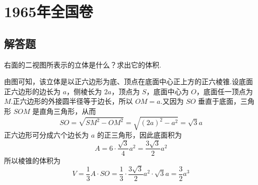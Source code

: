 \documentclass[UTF8,a4paper,oneside,11pt]{ctexbook}
\begin{document}
\mainmatter


\chapter{1965年全国卷}

\section{解答题}

\begin{problem}
右面的二视图所表示的立体是什么？求出它的体积.

\end{problem}

\begin{solution}
由图可知，该立体是以正六边形为底、顶点在底面中心正上方的正六棱锥.设底面正六边形的边长为 \(a\)，侧棱长为 \(2a\)，顶点为 \(S\)，底面中心为 \(O\)，底面任一顶点为 \(M\).正六边形的外接圆半径等于边长，所以 \(OM=a\).又因为 \(SO\) 垂直于底面，三角形 \(SOM\) 是直角三角形，从而
\[
SO=\sqrt{SM^2-OM^2}=\sqrt{(2a)^2-a^2}=\sqrt{3}a
\]
正六边形可分成六个边长为 \(a\) 的正三角形，因此底面积为
\[
A=6\cdot\frac{\sqrt{3}}{4}a^2=\frac{3\sqrt{3}}{2}a^2
\]
所以棱锥的体积为
\[
V=\frac{1}{3}A\cdot SO=\frac{1}{3}\cdot\frac{3\sqrt{3}}{2}a^2\cdot\sqrt{3}a=\frac{3}{2}a^3
\]
\end{solution}
\end{document}
